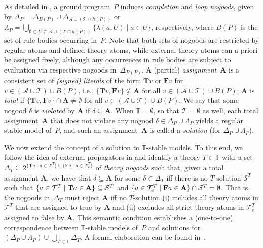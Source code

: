 \documentclass[a4paper,USenglish]{oasics-v2016}
\newcommand{\body}[1]{\ensuremath{B(#1)}}
\newcommand{\head}[1]{\ensuremath{h(#1)}}
\newcommand{\Tsign}{\ensuremath{\mathbf{T}}}
\newcommand{\Fsign}{\ensuremath{\mathbf{F}}}
\newcommand{\Tlit}[1]{\ensuremath{\Tsign #1}}
\newcommand{\Flit}[1]{\ensuremath{\Fsign #1}}
\newcommand{\Ass}{\ensuremath{\mathbf{A}}}
\begin{document}
As detailed in \cite{gekasc09c}, a ground program~$P$ induces
\emph{completion} and \emph{loop nogoods},
%
given by %
\(
  \Delta_P = \Delta_{\body{P}} \cup
             \Delta_{\mathcal{A}\cup(\mathcal{T}\cap\head{P})}
\)
or
\(
  \Lambda_P = \mbox{$\bigcup_{\emptyset\subset U\subseteq \mathcal{A}\cup(\mathcal{T}\cap\head{P})}$}
              \{ \lambda(a,U) \mid a\in U \}
\),
respectively,
where $\body{P}$ is the set of rule bodies occurring in~$P$.
Note that both sets of nogoods are restricted by regular atoms and defined theory atoms,
while external theory atoms can a priori be assigned freely,
although any occurrences in rule bodies are subject to evaluation
via respective nogoods in~$\Delta_{\body{P}}$.
%
A (partial) \emph{assignment}~$\Ass$ is a consistent set
of \emph{(signed) literals} of the form $\Tlit{v}$ or $\Flit{v}$ for
$v\in(\mathcal{A}\cup\mathcal{T})\cup\body{P}$,
i.e., $\{\Tlit{v},\Flit{v}\}\nsubseteq\Ass$
for all $v\in(\mathcal{A}\cup\mathcal{T})\cup\body{P}$;
$\Ass$ is \emph{total} if $\{\Tlit{v},\Flit{v}\}\cap\Ass\neq\emptyset$
for all $v\in(\mathcal{A}\cup\mathcal{T})\cup\body{P}$.
We say that some nogood $\delta$ is \emph{violated} by $\Ass$ if $\delta\subseteq\Ass$.
%
When $\mathbb{T}=\emptyset$, so that $\mathcal{T}=\emptyset$ as well,
each total assignment~$\Ass$ that does not violate any nogood $\delta\in\Delta_P\cup\Lambda_P$
yields a regular stable model of~$P$, and such an assignment~$\Ass$ is called a \emph{solution}
(for $\Delta_P\cup\Lambda_P$).

We now extend the concept of a solution to $\mathbb{T}$-stable models.
To this end,
we follow the idea of external propagators in \cite{drewal12a}
and identify a theory $T\in\mathbb{T}$ with a set
$\Delta_T\subseteq 2^{\{\Tlit{a}\mid a\in\mathcal{T}^T\}\cup\{\Flit{a}\mid a\in\mathcal{T}^T_e\}}$
of \emph{theory nogoods} such that,
given a total assignment $\Ass$,
we have that $\delta\subseteq\Ass$ for some $\delta\in\Delta_T$
iff
there is no $T$-solution $\mathcal{S}^T$ such that
$\{a\in\mathcal{T}^T\mid\Tlit{a}\in\nolinebreak\Ass\}\subseteq\mathcal{S}^T$
and
$\{a\in\mathcal{T}^T_e\mid\Flit{a}\in\nolinebreak\Ass\}\cap\mathcal{S}^T=\emptyset$.
%
That is, the nogoods in~$\Delta_T$ must reject $\Ass$ iff no $T$-solution
(i)
includes all theory atoms in $\mathcal{T}^T$ that are assigned to true by $\Ass$
and
(ii)
excludes all strict theory atoms in $\mathcal{T}^T_e$ assigned to false by $\Ass$.
This semantic condition establishes a (one-to-one) correspondence between
$\mathbb{T}$-stable models of~$P$ and solutions for $(\Delta_P\cup\Lambda_P)\cup\bigcup_{T\in\mathbb{T}}\Delta_T$.
%
A formal elaboration can be found in~\cite{gekakaosscwa16b}.
\end{document}
